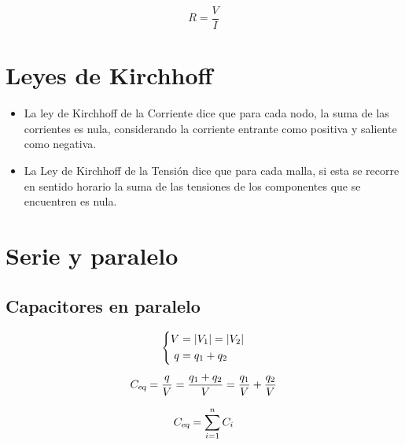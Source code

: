 \begin{mdframed}[style=MyFrame1]
    \begin{defn}
    \end{defn}
    \begin{equation*}
        R = \frac{V}{I}
    \end{equation*}
\end{mdframed}


\section{Leyes de Kirchhoff}

\begin{itemize}
\item La ley de Kirchhoff de la Corriente dice que para cada nodo, la suma de las corrientes es nula, considerando la corriente entrante como positiva y saliente como negativa.

\item La Ley de Kirchhoff de la Tensión dice que para cada malla, si esta se recorre en sentido horario la suma de las tensiones de los componentes que se encuentren es nula.
\end{itemize}


\section{Serie y paralelo}


\subsection{Capacitores en paralelo}

\begin{gather*}
    \left\{
    \begin{aligned}
        V &= {\left| {V_1} \right|} = {\left| {V_2} \right|}
        \\
        q &= q_1 + q_2
    \end{aligned}
    \right.
    \\[1ex]
    {{C}_\textsl{{eq}}} = \frac{q}{V} = \frac{q_1 + q_2}{V} = \frac{q_1}{V} + \frac{q_2}{V}
\end{gather*}

\begin{mdframed}[style=MyFrame1]
    \begin{prop}
    \end{prop}
    \begin{equation*}
        {{C}_\textsl{{eq}}} = \sum_{i=1}^n C_i
    \end{equation*}
\end{mdframed}


